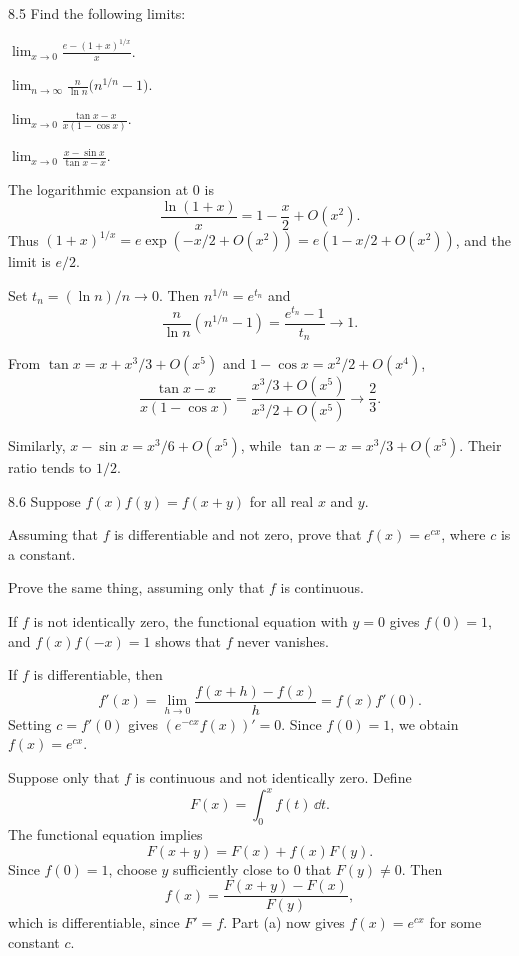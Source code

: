 \documentclass[11pt, oneside]{article}
\begin{document}
\begin{exercise}{8.5}
Find the following limits:
\begin{exercisesubparts}
\item $\displaystyle\lim_{x\to0}\frac{e-(1+x)^{1/x}}x$.
\item $\displaystyle\lim_{n\to\infty}\frac{n}{\ln n}\bigl(n^{1/n}-1\bigr)$.
\item $\displaystyle\lim_{x\to0}\frac{\tan x-x}{x(1-\cos x)}$.
\item $\displaystyle\lim_{x\to0}\frac{x-\sin x}{\tan x-x}$.
\end{exercisesubparts}
\end{exercise}
\begin{solution}
\begin{exercisesubparts}
\item The logarithmic expansion at $0$ is
\[
 \frac{\ln(1+x)}x=1-\frac x2+O(x^2).
\]
Thus $(1+x)^{1/x}=e\exp(-x/2+O(x^2))=e(1-x/2+O(x^2))$, and the limit is $e/2$.
\item Set $t_n=(\ln n)/n\to0$. Then $n^{1/n}=e^{t_n}$ and
\[
 \frac{n}{\ln n}(n^{1/n}-1)=\frac{e^{t_n}-1}{t_n}\longrightarrow1.
\]
\item From $\tan x=x+x^3/3+O(x^5)$ and $1-\cos x=x^2/2+O(x^4)$,
\[
 \frac{\tan x-x}{x(1-\cos x)}
 =\frac{x^3/3+O(x^5)}{x^3/2+O(x^5)}\longrightarrow\frac23.
\]

\item Similarly, $x-\sin x=x^3/6+O(x^5)$, while $\tan x-x=x^3/3+O(x^5)$. Their ratio tends to $1/2$.
\end{exercisesubparts}
\end{solution}

\begin{exercise}{8.6}
Suppose $f(x)f(y)=f(x+y)$ for all real $x$ and $y$.
\begin{exercisesubparts}
\item Assuming that $f$ is differentiable and not zero, prove that $f(x)=e^{cx}$, where $c$ is a constant.
\item Prove the same thing, assuming only that $f$ is continuous.
\end{exercisesubparts}
\end{exercise}
\begin{solution}
If $f$ is not identically zero, the functional equation with $y=0$ gives $f(0)=1$, and $f(x)f(-x)=1$ shows that $f$ never vanishes.
\begin{exercisesubparts}
\item If $f$ is differentiable, then
\[
 f'(x)=\lim_{h\to0}\frac{f(x+h)-f(x)}h
 =f(x)f'(0).
\]
Setting $c=f'(0)$ gives $(e^{-cx}f(x))'=0$. Since $f(0)=1$, we obtain $f(x)=e^{cx}$.
\item Suppose only that $f$ is continuous and not identically zero. Define
\[
 F(x)=\int_0^x f(t)\,\dd t.
\]
The functional equation implies
\[
 F(x+y)=F(x)+f(x)F(y).
\]
Since $f(0)=1$, choose $y$ sufficiently close to $0$ that $F(y)\ne0$. Then
\[
 f(x)=\frac{F(x+y)-F(x)}{F(y)},
\]
which is differentiable, since $F'=f$. Part (a) now gives $f(x)=e^{cx}$ for some constant $c$.
\end{exercisesubparts}

\end{solution}
\end{document}

